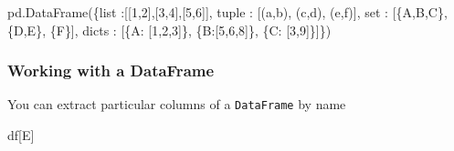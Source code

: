 \documentclass[
  letterpaper,
]{scrbook}
\newenvironment{Shaded}{\begin{snugshade}}{\end{snugshade}}
\newcommand{\DecValTok}[1]{\textcolor[rgb]{0.00,0.00,0.81}{#1}}
\newcommand{\NormalTok}[1]{#1}
\newcommand{\StringTok}[1]{\textcolor[rgb]{0.31,0.60,0.02}{#1}}
\begin{document}
\begin{Shaded}
\begin{Highlighting}[]
\NormalTok{pd.DataFrame(\{}\StringTok{\textquotesingle{}list\textquotesingle{}}\NormalTok{ :[[}\DecValTok{1}\NormalTok{,}\DecValTok{2}\NormalTok{],[}\DecValTok{3}\NormalTok{,}\DecValTok{4}\NormalTok{],[}\DecValTok{5}\NormalTok{,}\DecValTok{6}\NormalTok{]],}
             \StringTok{\textquotesingle{}tuple\textquotesingle{}}\NormalTok{ : [(}\StringTok{\textquotesingle{}a\textquotesingle{}}\NormalTok{,}\StringTok{\textquotesingle{}b\textquotesingle{}}\NormalTok{), (}\StringTok{\textquotesingle{}c\textquotesingle{}}\NormalTok{,}\StringTok{\textquotesingle{}d\textquotesingle{}}\NormalTok{), (}\StringTok{\textquotesingle{}e\textquotesingle{}}\NormalTok{,}\StringTok{\textquotesingle{}f\textquotesingle{}}\NormalTok{)],}
              \StringTok{\textquotesingle{}set\textquotesingle{}}\NormalTok{ : [\{}\StringTok{\textquotesingle{}A\textquotesingle{}}\NormalTok{,}\StringTok{\textquotesingle{}B\textquotesingle{}}\NormalTok{,}\StringTok{\textquotesingle{}C\textquotesingle{}}\NormalTok{\}, \{}\StringTok{\textquotesingle{}D\textquotesingle{}}\NormalTok{,}\StringTok{\textquotesingle{}E\textquotesingle{}}\NormalTok{\}, \{}\StringTok{\textquotesingle{}F\textquotesingle{}}\NormalTok{\}], }
            \StringTok{\textquotesingle{}dicts\textquotesingle{}}\NormalTok{ : [\{}\StringTok{\textquotesingle{}A\textquotesingle{}}\NormalTok{: [}\DecValTok{1}\NormalTok{,}\DecValTok{2}\NormalTok{,}\DecValTok{3}\NormalTok{]\}, \{}\StringTok{\textquotesingle{}B\textquotesingle{}}\NormalTok{:[}\DecValTok{5}\NormalTok{,}\DecValTok{6}\NormalTok{,}\DecValTok{8}\NormalTok{]\}, \{}\StringTok{\textquotesingle{}C\textquotesingle{}}\NormalTok{: [}\DecValTok{3}\NormalTok{,}\DecValTok{9}\NormalTok{]\}]\})}
\end{Highlighting}
\end{Shaded}

\hypertarget{working-with-a-dataframe}{%
\subsubsection{Working with a DataFrame}\label{working-with-a-dataframe}}

You can extract particular columns of a \texttt{DataFrame} by name

\begin{Shaded}
\begin{Highlighting}[]
\NormalTok{df[}\StringTok{\textquotesingle{}E\textquotesingle{}}\NormalTok{]}
\end{Highlighting}
\end{Shaded}
\end{document}
